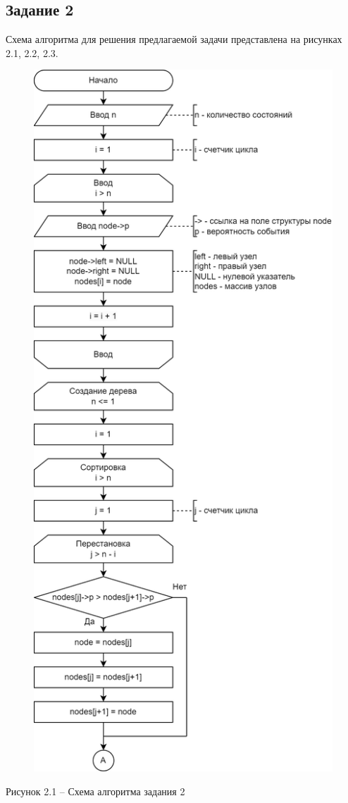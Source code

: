 \documentclass[a4paper,14pt]{extarticle}
\begin{document}
  \newpage
  \subsection*{Задание 2}
  Схема алгоритма для решения предлагаемой задачи представлена на рисунках 2.1, 2.2, 2.3.

  \begin{figure}[h]
    \centering
    \includegraphics[width=0.5\linewidth]{schemes/s-2-1}
  \end{figure}
  \begin{center}
    Рисунок 2.1 – Схема алгоритма задания 2
  \end{center}
  \pagebreak
\end{document}
